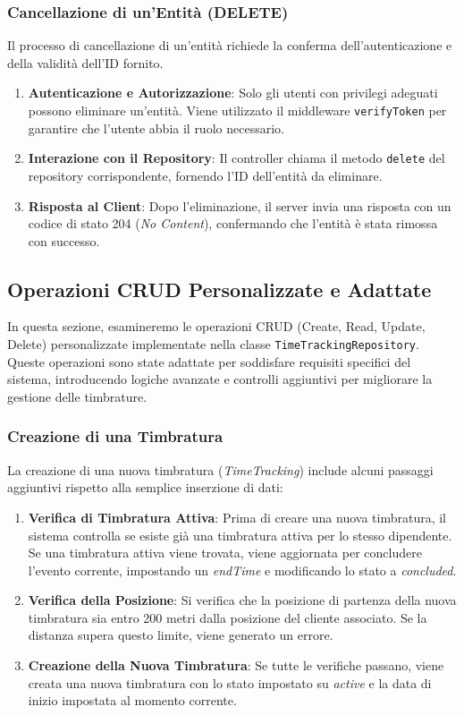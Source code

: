 \documentclass[twoside]{supsistudent}
\begin{document}
\subsubsection{Cancellazione di un'Entità (DELETE)}

Il processo di cancellazione di un'entità richiede la conferma dell'autenticazione e della validità dell'ID fornito.

\begin{enumerate}
  \item \textbf{Autenticazione e Autorizzazione}: Solo gli utenti con privilegi adeguati possono eliminare un'entità. Viene utilizzato il middleware \texttt{verifyToken} per garantire che l'utente abbia il ruolo necessario.
  \item \textbf{Interazione con il Repository}: Il controller chiama il metodo \texttt{delete} del repository corrispondente, fornendo l'ID dell'entità da eliminare.
  \item \textbf{Risposta al Client}: Dopo l'eliminazione, il server invia una risposta con un codice di stato 204 (\textit{No Content}), confermando che l'entità è stata rimossa con successo.
\end{enumerate}

\subsection{Operazioni CRUD Personalizzate e Adattate}

In questa sezione, esamineremo le operazioni CRUD (Create, Read, Update, Delete) personalizzate implementate nella classe \texttt{TimeTrackingRepository}. Queste operazioni sono state adattate per soddisfare requisiti specifici del sistema, introducendo logiche avanzate e controlli aggiuntivi per migliorare la gestione delle timbrature.

\subsubsection{Creazione di una Timbratura}

La creazione di una nuova timbratura (\textit{TimeTracking}) include alcuni passaggi aggiuntivi rispetto alla semplice inserzione di dati:

\begin{enumerate}
  \item \textbf{Verifica di Timbratura Attiva}: Prima di creare una nuova timbratura, il sistema controlla se esiste già una timbratura attiva per lo stesso dipendente. Se una timbratura attiva viene trovata, viene aggiornata per concludere l'evento corrente, impostando un \textit{endTime} e modificando lo stato a \textit{concluded}.
  \item \textbf{Verifica della Posizione}: Si verifica che la posizione di partenza della nuova timbratura sia entro 200 metri dalla posizione del cliente associato. Se la distanza supera questo limite, viene generato un errore.
  \item \textbf{Creazione della Nuova Timbratura}: Se tutte le verifiche passano, viene creata una nuova timbratura con lo stato impostato su \textit{active} e la data di inizio impostata al momento corrente.
\end{enumerate}
\end{document}
